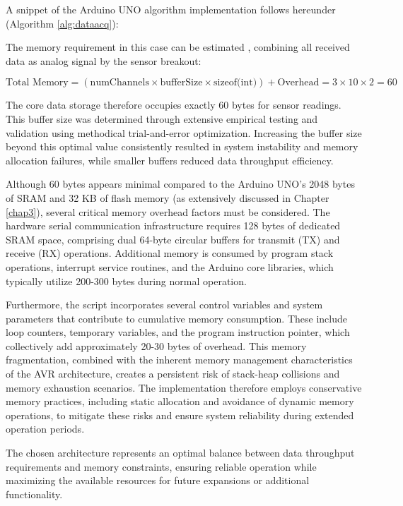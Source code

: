 {	
	A snippet of the Arduino UNO algorithm implementation follows hereunder (Algorithm \ref{alg:dataacq}):  

	The memory requirement in this case can be estimated , combining all received data as analog signal by the sensor breakout: 
	
	\[
	\text{Total Memory} = (\text{numChannels} \times \text{bufferSize} \times \text{sizeof(int)}) + \text{Overhead} = 3 \times 10 \times 2 = 60
	\]
	
	The core data storage therefore occupies exactly 60 bytes for sensor readings. This buffer size was determined through extensive empirical testing and validation using methodical trial-and-error optimization. Increasing the buffer size beyond this optimal value consistently resulted in system instability and memory allocation failures, while smaller buffers reduced data throughput efficiency.
	
	Although 60 bytes appears minimal compared to the Arduino UNO's 2048 bytes of SRAM and 32 KB of flash memory (as extensively discussed in Chapter \ref{chap3}), several critical memory overhead factors must be considered. The hardware serial communication infrastructure requires 128 bytes of dedicated SRAM space, comprising dual 64-byte circular buffers for transmit (TX) and receive (RX) operations. Additional memory is consumed by program stack operations, interrupt service routines, and the Arduino core libraries, which typically utilize 200-300 bytes during normal operation.
	
	Furthermore, the script incorporates several control variables and system parameters that contribute to cumulative memory consumption. These include loop counters, temporary variables, and the program instruction pointer, which collectively add approximately 20-30 bytes of overhead. This memory fragmentation, combined with the inherent memory management characteristics of the AVR architecture, creates a persistent risk of stack-heap collisions and memory exhaustion scenarios. The implementation therefore employs conservative memory practices, including static allocation and avoidance of dynamic memory operations, to mitigate these risks and ensure system reliability during extended operation periods.
	
	The chosen architecture represents an optimal balance between data throughput requirements and memory constraints, ensuring reliable operation while maximizing the available resources for future expansions or additional functionality.
	
}

